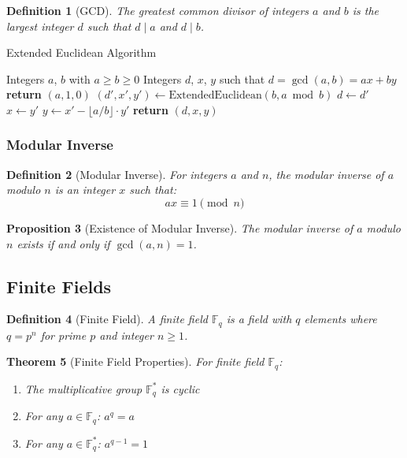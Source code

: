 \documentclass[11pt,a4paper]{article}
\newtheorem{theorem}{Theorem}[section]
\newtheorem{proposition}[theorem]{Proposition}
\newtheorem{definition}[theorem]{Definition}
\begin{document}
\begin{definition}[GCD]
The greatest common divisor of integers $a$ and $b$ is the largest integer $d$ such that $d \mid a$ and $d \mid b$.
\end{definition}

\begin{algorithm}
\caption{Extended Euclidean Algorithm}
\begin{algorithmic}[1]
\REQUIRE Integers $a$, $b$ with $a \geq b \geq 0$
\ENSURE Integers $d$, $x$, $y$ such that $d = \gcd(a,b) = ax + by$
    \STATE \textbf{return} $(a, 1, 0)$
\ELSE
    \STATE $(d', x', y') \leftarrow \text{ExtendedEuclidean}(b, a \bmod b)$
    \STATE $d \leftarrow d'$
    \STATE $x \leftarrow y'$
    \STATE $y \leftarrow x' - \lfloor a/b \rfloor \cdot y'$
    \STATE \textbf{return} $(d, x, y)$
\ENDIF
\end{algorithmic}
\end{algorithm}

\subsubsection{Modular Inverse}

\begin{definition}[Modular Inverse]
For integers $a$ and $n$, the modular inverse of $a$ modulo $n$ is an integer $x$ such that:
$$ax \equiv 1 \pmod{n}$$
\end{definition}

\begin{proposition}[Existence of Modular Inverse]
The modular inverse of $a$ modulo $n$ exists if and only if $\gcd(a,n) = 1$.
\end{proposition}

\subsection{Finite Fields}

\begin{definition}[Finite Field]
A finite field $\mathbb{F}_q$ is a field with $q$ elements where $q = p^n$ for prime $p$ and integer $n \geq 1$.
\end{definition}

\begin{theorem}[Finite Field Properties]
For finite field $\mathbb{F}_q$:
\begin{enumerate}
\item The multiplicative group $\mathbb{F}_q^*$ is cyclic
\item For any $a \in \mathbb{F}_q$: $a^q = a$
\item For any $a \in \mathbb{F}_q^*$: $a^{q-1} = 1$
\end{enumerate}
\end{theorem}
\end{document}
